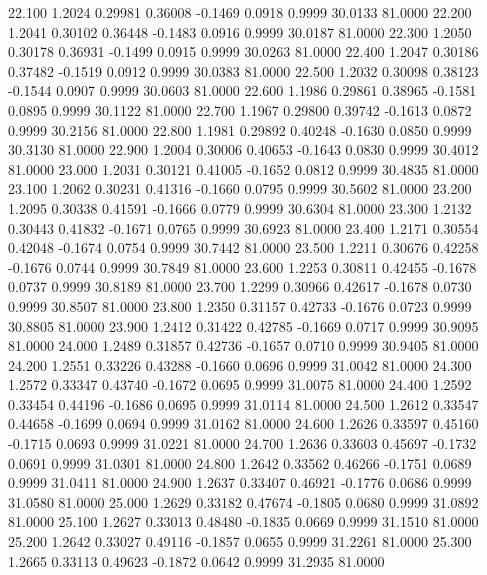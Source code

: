   22.100   1.2024   0.29981   0.36008  -0.1469   0.0918   0.9999  30.0133  81.0000
  22.200   1.2041   0.30102   0.36448  -0.1483   0.0916   0.9999  30.0187  81.0000
  22.300   1.2050   0.30178   0.36931  -0.1499   0.0915   0.9999  30.0263  81.0000
  22.400   1.2047   0.30186   0.37482  -0.1519   0.0912   0.9999  30.0383  81.0000
  22.500   1.2032   0.30098   0.38123  -0.1544   0.0907   0.9999  30.0603  81.0000
  22.600   1.1986   0.29861   0.38965  -0.1581   0.0895   0.9999  30.1122  81.0000
  22.700   1.1967   0.29800   0.39742  -0.1613   0.0872   0.9999  30.2156  81.0000
  22.800   1.1981   0.29892   0.40248  -0.1630   0.0850   0.9999  30.3130  81.0000
  22.900   1.2004   0.30006   0.40653  -0.1643   0.0830   0.9999  30.4012  81.0000
  23.000   1.2031   0.30121   0.41005  -0.1652   0.0812   0.9999  30.4835  81.0000
  23.100   1.2062   0.30231   0.41316  -0.1660   0.0795   0.9999  30.5602  81.0000
  23.200   1.2095   0.30338   0.41591  -0.1666   0.0779   0.9999  30.6304  81.0000
  23.300   1.2132   0.30443   0.41832  -0.1671   0.0765   0.9999  30.6923  81.0000
  23.400   1.2171   0.30554   0.42048  -0.1674   0.0754   0.9999  30.7442  81.0000
  23.500   1.2211   0.30676   0.42258  -0.1676   0.0744   0.9999  30.7849  81.0000
  23.600   1.2253   0.30811   0.42455  -0.1678   0.0737   0.9999  30.8189  81.0000
  23.700   1.2299   0.30966   0.42617  -0.1678   0.0730   0.9999  30.8507  81.0000
  23.800   1.2350   0.31157   0.42733  -0.1676   0.0723   0.9999  30.8805  81.0000
  23.900   1.2412   0.31422   0.42785  -0.1669   0.0717   0.9999  30.9095  81.0000
  24.000   1.2489   0.31857   0.42736  -0.1657   0.0710   0.9999  30.9405  81.0000
  24.200   1.2551   0.33226   0.43288  -0.1660   0.0696   0.9999  31.0042  81.0000
  24.300   1.2572   0.33347   0.43740  -0.1672   0.0695   0.9999  31.0075  81.0000
  24.400   1.2592   0.33454   0.44196  -0.1686   0.0695   0.9999  31.0114  81.0000
  24.500   1.2612   0.33547   0.44658  -0.1699   0.0694   0.9999  31.0162  81.0000
  24.600   1.2626   0.33597   0.45160  -0.1715   0.0693   0.9999  31.0221  81.0000
  24.700   1.2636   0.33603   0.45697  -0.1732   0.0691   0.9999  31.0301  81.0000
  24.800   1.2642   0.33562   0.46266  -0.1751   0.0689   0.9999  31.0411  81.0000
  24.900   1.2637   0.33407   0.46921  -0.1776   0.0686   0.9999  31.0580  81.0000
  25.000   1.2629   0.33182   0.47674  -0.1805   0.0680   0.9999  31.0892  81.0000
  25.100   1.2627   0.33013   0.48480  -0.1835   0.0669   0.9999  31.1510  81.0000
  25.200   1.2642   0.33027   0.49116  -0.1857   0.0655   0.9999  31.2261  81.0000
  25.300   1.2665   0.33113   0.49623  -0.1872   0.0642   0.9999  31.2935  81.0000
